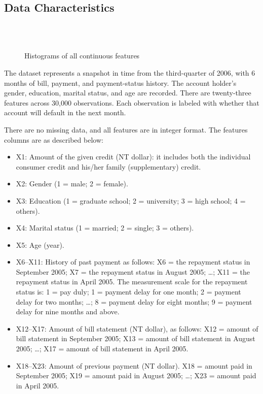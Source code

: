 \documentclass[conference]{IEEEtran}
\begin{document}
\subsection{Data Characteristics}

\begin{figure}[ht]
	\\
	\\
	\caption{Histograms of all continuous features}
	\label{hists}
\end{figure}

The dataset represents a snapshot in time from the third-quarter of 2006, with
6 months of bill, payment, and payment-status history. The account holder's
gender, education, marital status, and age are recorded. There are twenty-three
features across 30,000 observations. Each observation is labeled with whether
that account will default in the next month.

There are no missing data, and all features are in integer format. The features
columns are as described below\cite{Yeh2009TheCO}:

\begin{itemize}
	\item X1: Amount of the given credit (NT dollar): it includes both the individual
	      consumer credit and his/her family (supplementary) credit.
	\item X2: Gender (1 = male; 2 = female).
	\item X3: Education (1 = graduate school; 2 = university; 3 = high school; 4 =
	      others).
	\item X4: Marital status (1 = married; 2 = single; 3 = others).
	\item X5: Age (year).
	\item X6–X11: History of past payment as follows: X6 = the repayment status in
	      September 2005; X7 = the repayment status in August 2005; \ldots ; X11 = the
	      repayment status in April 2005. The measurement scale for the repayment status
	      is: 1 = pay duly; 1 = payment delay for one month; 2 = payment delay for two
	      months; \ldots ; 8 = payment delay for eight months; 9 = payment delay for nine
	      months and above.
	\item X12–X17: Amount of bill statement (NT dollar), as follows: X12 = amount of bill
	      statement in September 2005; X13 = amount of bill statement in August 2005;
	      \ldots ; X17 = amount of bill statement in April 2005.
	\item X18–X23: Amount of previous payment (NT dollar). X18 = amount paid in September
	      2005; X19 = amount paid in August 2005; \ldots ; X23 = amount paid in April
	      2005.
\end{itemize}
\end{document}
